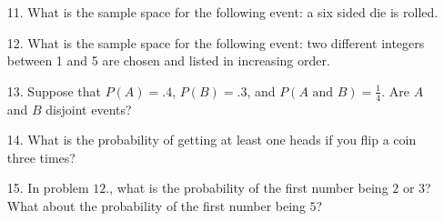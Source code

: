 \documentclass[oneside]{amsart}
\theoremstyle{definition}
\theoremstyle{definition}
\begin{document}
\begin{itemize}
    \item[11.] What is the sample space for the following event: a six sided die is rolled.
    \vfill

    \item[12.] What is the sample space for the following event: two different integers between 1 and 5 are chosen and listed in increasing order.
    \vfill

    \item[13.] Suppose that $P(A) = .4$, $P(B)=.3$, and $P(A \text{ and } B)= \frac{1}{4}$. Are $A$ and $B$ disjoint events?
    \vfill

    \item[14.] What is the probability of getting at least one heads if you flip a coin three times?
    \vfill

    \item[15.] In problem $12.$, what is the probability of the first number being $2$ or $3$? What about the probability of the first number being $5$?
    \vfill

    
\end{itemize}
\end{document}
